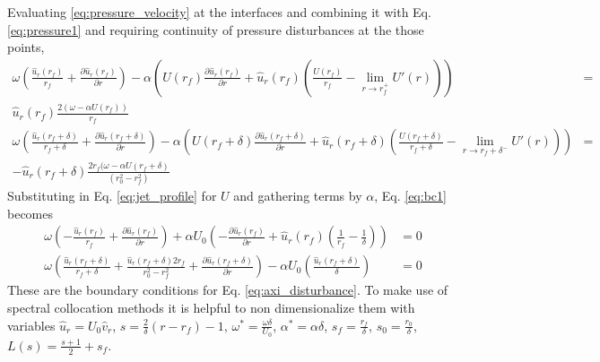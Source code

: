 \documentclass[superscriptaddress, onecolumn, prl]{revtex4}
\begin{document}
Evaluating \ref{eq:pressure_velocity} at the interfaces and combining it with Eq. \ref{eq:pressure1} and requiring continuity of pressure disturbances at the those points,
\begin{equation}
\label{eq:bc1}
\begin{split}
\omega  \left(\frac{\hat{u}_r(r_f)}{r_f}+\frac{\partial \hat{u}_r(r_f)}{\partial r} \right) - \alpha \left(U(r_f) \frac{\partial \hat{u}_r(r_f)}{\partial r}+\hat{u}_r(r_f) \left(\frac{U(r_f)}{r_f}-\lim_{r \rightarrow r_f^+}U'(r) \right) \right)&= \\\hat{u}_r(r_f) \frac{2(\omega - \alpha U(r_f))}{r_f}& \\
\omega  \left(\frac{\hat{u}_r(r_f+\delta)}{r_f+\delta}+\frac{\partial \hat{u}_r(r_f+\delta)}{\partial r} \right) - \alpha \left(U(r_f+\delta) \frac{\partial \hat{u}_r(r_f+\delta)}{\partial r}+\hat{u}_r(r_f+\delta) \left(\frac{U(r_f+\delta)}{r_f+\delta}-\lim_{r \rightarrow r_f+\delta^-}U'(r) \right) \right)&= \\
-\hat{u}_r(r_f+\delta) \frac{2 r_f(\omega - \alpha U(r_f+\delta)}{(r_0^2 - r_f^2)}& 
\end{split}
\end{equation}
Substituting in Eq. \ref{eq:jet_profile} for $U$ and gathering terms by $\alpha$, Eq. \ref{eq:bc1} becomes 
\begin{equation}
\label{eq:bc2}
\begin{split}
\omega  \left(-\frac{\hat{u}_r(r_f)}{r_f}+\frac{\partial \hat{u}_r(r_f)}{\partial r} \right) + \alpha U_0 \left(-\frac{\partial \hat{u}_r(r_f)}{\partial r}+\hat{u}_r(r_f) \left(\frac{1}{r_f} - \frac{1}{\delta} \right) \right) &= 0 \\
\omega  \left(\frac{\hat{u}_r(r_f+\delta)}{r_f+\delta}+\frac{\hat{u}_r(r_f+\delta)2 r_f}{r_0^2 - r_f^2}+\frac{\partial \hat{u}_r(r_f+\delta)}{\partial r} \right) - \alpha U_0 \left(\frac{\hat{u}_r(r_f+\delta) }{\delta} \right)&=0
\end{split}
\end{equation}
These are the boundary conditions for Eq. \ref{eq:axi_disturbance}. To make use of spectral collocation methods it is helpful to non dimensionalize them with variables $\hat{u}_r = U_0 \hat{v}_r$, $s=\frac{2}{\delta}(r-r_f)-1$, $\omega^* = \frac{\omega \delta}{U_0}$, $\alpha^* = \alpha \delta$, $s_f=\frac{r_f}{\delta}$, $s_0=\frac{r_0}{\delta}$, $L(s) = \frac{s+1}{2} + s_f$.
\end{document}
